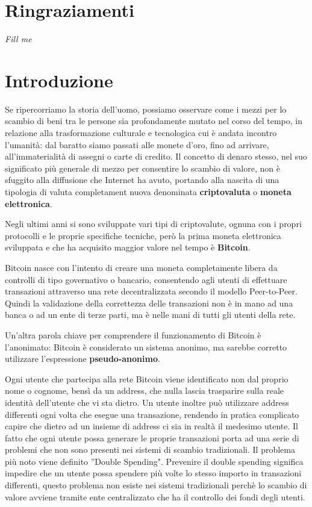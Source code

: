 \chapter*{Ringraziamenti} %
\begin{flushright}
\itshape 
Fill me
\end{flushright}


\chapter{Introduzione}
Se ripercorriamo la storia dell'uomo, possiamo osservare come i mezzi per lo scambio di beni tra le persone sia profondamente mutato nel corso del tempo, in relazione alla trasformazione culturale e tecnologica cui è andata incontro l’umanità: dal baratto siamo passati alle monete d’oro, fino ad arrivare, all’immaterialità di assegni o carte di credito. Il concetto di denaro stesso, nel suo significato più generale di mezzo per consentire lo scambio di valore, non è sfuggito alla diffusione che Internet ha avuto, portando alla nascita di una tipologia di valuta completament nuova denominata \textbf{criptovaluta} o \textbf{moneta elettronica}. 

Negli ultimi anni si sono sviluppate vari tipi di criptovalute, ognuna con i propri protocolli e le proprie specifiche tecniche, però la prima moneta elettronica sviluppata e che ha acquisito maggior valore nel tempo è \textbf{Bitcoin}. 

Bitcoin nasce con l'intento di creare una moneta completamente libera da controlli di tipo governativo o bancario, consentendo agli utenti di effettuare transazioni attraverso una rete decentralizzata secondo il modello Peer-to-Peer. Quindi la validazione della correttezza delle transazioni non è in mano ad una banca o ad un ente di terze parti, ma è nelle mani di tutti gli utenti della rete. 

Un’altra parola chiave per comprendere il funzionamento di Bitcoin è l’anonimato: Bitcoin è considerato un sistema anonimo, ma sarebbe corretto utilizzare l’espressione \textbf{pseudo-anonimo}.

Ogni utente che partecipa alla rete Bitcoin viene identificato non dal proprio nome o cognome, bensì da un address, che nulla lascia trasparire sulla reale identità dell'utente che vi sta dietro. Un utente inoltre può utilizzare address differenti ogni volta che esegue
una transazione, rendendo in pratica complicato capire che dietro ad un insieme di address ci sia in realtà il medesimo utente. Il fatto che ogni utente possa generare le proprie transazioni porta ad una serie di problemi che non sono presenti nei sistemi di scambio tradizionali. Il problema più noto viene definito ''Double Spending". Prevenire il double spending significa impedire che un utente possa spendere più volte lo stesso importo in transazioni differenti, questo problema non esiste nei sistemi tradizionali perchè lo scambio di valore avviene tramite ente centralizzato che ha il controllo dei fondi degli utenti. 

